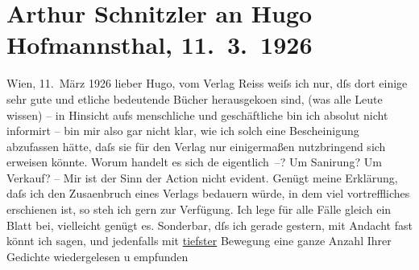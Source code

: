 

         
         \renewcommand{\erwaehntePersonen}{Personen: Hugo von Hofmannsthal, Lili Schnitzler}
         \renewcommand{\erwaehnteInstitutionen}{Institutionen: Erich-Reiss-Verlag}
         \renewcommand{\erwaehnteOrte}{Orte: Wien}
         \renewcommand{\erwaehnteWerke}{}
               \section[Arthur Schnitzler an Hugo Hofmannsthal, 11. 3. 1926]{ Arthur Schnitzler an Hugo Hofmannsthal, 11. 3. 1926}\nopagebreak{}\rehead{ }\begin{ledgroupsized}[t]{13cm}\normalsize\beginnumbering{} \toendnotes[C]{\smallbreak\pagebreak[2]} 
\pstart
           \raggedleft{}{\pb}Wien, 11. März 1926\pend
           \pstart
           lieber Hugo, vom Verlag Reiss
               weiſs ich nur, dſs dort einige sehr gute und etliche bedeutende Bücher herausgeko{\geminationm}en sind, (was alle Leute wissen) – \introOben{}in Hinsicht aufs\introOben{} menschliche und geschäftliche bin ich absolut nicht
               informirt – bin mir also gar nicht klar, wie ich solch eine Bescheinigung abzufassen
               hätte, daſs sie für den Verlag nur einigermaßen nutzbringend sich erweisen könnte.
               Worum handelt es sich de{\geminationn} eigentlich –? Um Sanirung? Um
               Verkauf? – Mir ist der Sinn der Action nicht evident. Genügt meine Erklärung, daſs
               ich den Zusa{\geminationm}enbruch eines Verlags bedauern würde, in
               dem viel vortreffliches erschienen ist, so steh ich gern zur Verfügung. Ich lege für
               alle Fälle gleich ein Blatt bei, vielleicht genügt es.\pend
           \pstart
           {\pb}Sonderbar, dſs ich gerade gestern, mit Andacht fast
               könnt ich sagen, und jedenfalls mit \uline{tiefster} Bewegung
               eine ganze Anzahl Ihrer Gedichte \introOben{}wieder\introOben{}gelesen u empfunden

\end{ledgroupsized}
